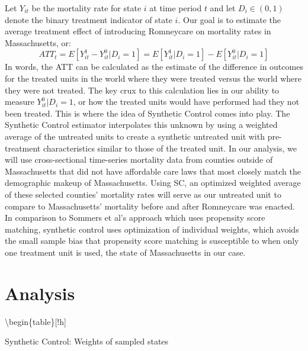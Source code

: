 \documentclass[
]{article}
\begin{document}
Let \(Y_{it}\) be the mortality rate for state \(i\) at time period
\(t\) and let \(D_i \in (0,1)\) denote the binary treatment indicator of
state \(i\). Our goal is to estimate the average treatment effect of
introducing Romneycare on mortality rates in Massachusetts, or:
\[ATT_t = E[Y_{it}^1 - Y_{it}^0 | D_i = 1] = E[Y_{it}^1|D_i = 1] - E[Y_{it}^0|D_i = 1]\]
In words, the ATT can be calculated as the estimate of the difference in
outcomes for the treated units in the world where they were treated
versus the world where they were not treated. The key crux to this
calculation lies in our ability to measure \(Y_{it}^0|D_i=1\), or how
the treated units would have performed had they not been treated. This
is where the idea of Synthetic Control comes into play. The Synthetic
Control estimator interpolates this unknown by using a weighted average
of the untreated units to create a synthetic untreated unit with
pre-treatment characteristics similar to those of the treated unit. In
our analysis, we will use cross-sectional time-series mortality data
from counties outside of Massachusetts that did not have affordable care
laws that most closely match the demographic makeup of Massachusetts.
Using SC, an optimized weighted average of these selected counties'
mortality rates will serve as our untreated unit to compare to
Massachusetts' mortality before and after Romneycare was enacted. In
comparison to Sommers et al's approach which uses propensity score
matching, synthetic control uses optimization of individual weights,
which avoids the small sample bias that propensity score matching is
susceptible to when only one treatment unit is used, the state of
Massachusetts in our case.

\hypertarget{analysis}{%
\section{Analysis}\label{analysis}}

\textbackslash begin\{table\}{[}!h{]}

\caption{\label{tab:sc}Synthetic Control: Weights of sampled states}
\end{document}
